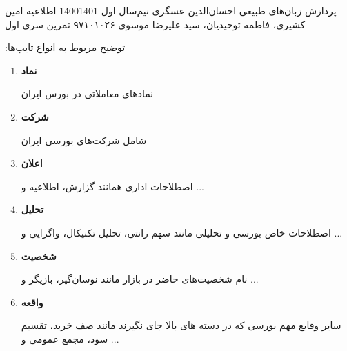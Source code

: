 \documentclass[a4paper,12pt]{article}
\begin{document}
\handout
{پردازش زبان‌های طبیعی}
{احسان‌الدین عسگری}
{نیم‌سال اول 1400\lr{-}1401}
{اطلاعیه}
{امین کشیری، فاطمه توحیدیان، سید علیرضا موسوی}
{۹۷۱۰۱۰۲۶}
{تمرین سری اول}

:توضیح مربوط به انواع تایپ‌ها
\begin{enumerate}
    \item \textbf{نماد}
    
    نمادهای معاملاتی در بورس ایران
    \item \textbf{شرکت}
    
    شامل شرکت‌های بورسی ایران 
    \item \textbf{اعلان}
    
    اصطلاحات اداری همانند گزارش، اطلاعیه و ...
	\item \textbf{تحلیل}
	
	اصطلاحات خاص بورسی و تحلیلی مانند سهم رانتی، تحلیل تکنیکال، واگرایی و ...
	\item \textbf{شخصیت}
	
	نام شخصیت‌های حاضر در بازار مانند نوسان‌گیر، بازیگر و ...
	\item  \textbf{واقعه}
	
	سایر وقایع مهم بورسی که در دسته های بالا جای نگیرند مانند صف خرید، تقسیم سود، مجمع عمومی و ...
\end{enumerate}
\end{document}
